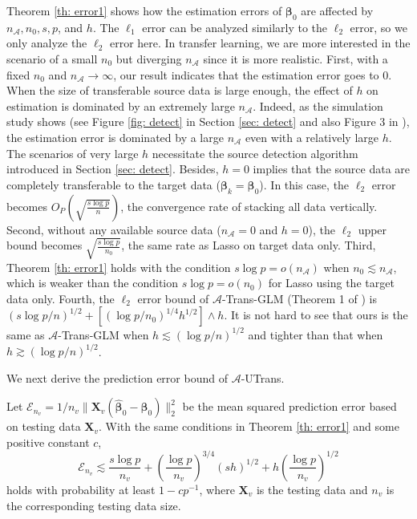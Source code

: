 \documentclass[twoside,12pt]{article}
\newcommand{\mb}[1]{\boldsymbol{\mathbf{#1}}}
\newcommand{\wh}[1]{\widehat{#1}}
\begin{document}
Theorem \ref{th: error1} shows how the estimation errors of $\mb\beta_0$ are affected by $n_{\mathcal A}, n_0, s, p$, and $h$.
The $\ell_1$ error can be analyzed similarly to the $\ell_2$ error, so we only analyze the $\ell_2$ error here.
In transfer learning, we are more interested in the scenario of a small $n_0$ but diverging $n_{\mathcal A}$ since it is more realistic.
First, with a fixed $n_0$ and $n_{\mathcal A}\rightarrow\infty$, our result indicates that the estimation error goes to 0.
When the size of transferable source data is large enough, the effect of $h$ on estimation is dominated by an extremely large $n_{\mathcal A}$.
Indeed, as the simulation study shows (see Figure \ref{fig: detect} in Section \ref{sec: detect} and also Figure 3 in \cite{tian2022transfer}), the estimation error is dominated by a large $n_{\mathcal A}$ even with a relatively large $h$.
The scenarios of very large $h$ necessitate the source detection algorithm introduced in Section \ref{sec: detect}.
Besides, $h=0$ implies that the source data are completely transferable to the target data ($\mb\beta_k=\mb\beta_0$).
In this case, the $\ell_2$ error becomes $O_P(\sqrt{\frac{s\log p}{n}})$, the convergence rate of stacking all data vertically.
Second, without any available source data ($n_{\mathcal A}=0$ and $h=0$), the $\ell_2$ upper bound becomes $\sqrt{\frac{s\log p}{n_0}}$, the same rate as Lasso on target data only.
Third, Theorem \ref{th: error1} holds with the condition $s\log p=o(n_{\mathcal A})$ when $n_0\lesssim n_{\mathcal A}$, which is weaker than the condition $s\log p=o(n_0)$ for Lasso using the target data only.
Fourth, the $\ell_2$ error bound of $\mathcal A$-Trans-GLM (Theorem 1 of \cite{tian2022transfer}) is $(s\log p/n)^{1/2}+[(\log p/n_0)^{1/4}h^{1/2}]\wedge h$.
It is not hard to see that ours is the same as $\mathcal A$-Trans-GLM when $h\lesssim(\log p/n)^{1/2}$ and tighter than that when $h\gtrsim(\log p/n)^{1/2}$.


We next derive the prediction error bound of $\mathcal A$-UTrans.

\begin{theorem}
	\label{th: pred}
	Let $\mathcal E_{n_v}=1/n_v\|\mb X_v\left(\wh{\mb\beta}_0-\mb\beta_0\right)\|_{2}^2$ be the mean squared prediction error based on testing data $\mb X_v$.
	With the same conditions in Theorem \ref{th: error1} and some positive constant $c$, 
	\begin{equation*}
	 \mathcal E_{n_v}\lesssim \frac{s\log p}{n_v}+\left(\frac{\log p}{n_v}\right)^{3/4}\left(sh\right)^{1/2}+h\left(\frac{\log p}{n_v}\right)^{1/2}
	\end{equation*}
holds with probability at least $1-cp^{-1}$,
	where $\mb X_v$ is the testing data and $n_v$ is the corresponding testing data size.
\end{theorem}
\end{document}
